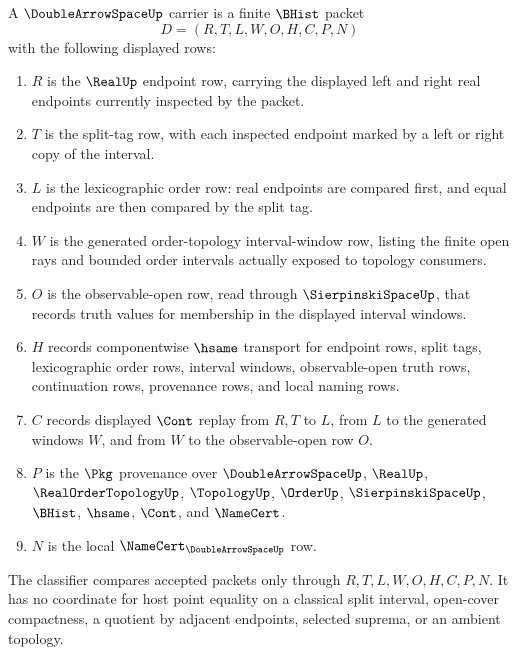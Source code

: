\begin{definition}
\label{def:double-arrow-space-carrier}
A $\DoubleArrowSpaceUp$ carrier is a finite $\BHist$ packet
$$
D=(R,T,L,W,O,H,C,P,N)
$$
with the following displayed rows:
\begin{enumerate}
\item $R$ is the $\RealUp$ endpoint row, carrying the displayed left and right real endpoints currently inspected by the packet.
\item $T$ is the split-tag row, with each inspected endpoint marked by a left or right copy of the interval.
\item $L$ is the lexicographic order row: real endpoints are compared first, and equal endpoints are then compared by the split tag.
\item $W$ is the generated order-topology interval-window row, listing the finite open rays and bounded order intervals actually exposed to topology consumers.
\item $O$ is the observable-open row, read through $\SierpinskiSpaceUp$, that records truth values for membership in the displayed interval windows.
\item $H$ records componentwise $\hsame$ transport for endpoint rows, split tags, lexicographic order rows, interval windows, observable-open truth rows, continuation rows, provenance rows, and local naming rows.
\item $C$ records displayed $\Cont$ replay from $R,T$ to $L$, from $L$ to the generated windows $W$, and from $W$ to the observable-open row $O$.
\item $P$ is the $\Pkg$ provenance over $\DoubleArrowSpaceUp$, $\RealUp$, $\RealOrderTopologyUp$, $\TopologyUp$, $\OrderUp$, $\SierpinskiSpaceUp$, $\BHist$, $\hsame$, $\Cont$, and $\NameCert$.
\item $N$ is the local $\NameCert_{\DoubleArrowSpaceUp}$ row.
\end{enumerate}
The classifier compares accepted packets only through $R,T,L,W,O,H,C,P,N$. It has no coordinate for host point equality on a classical split interval, open-cover compactness, a quotient by adjacent endpoints, selected suprema, or an ambient topology.
\end{definition}

